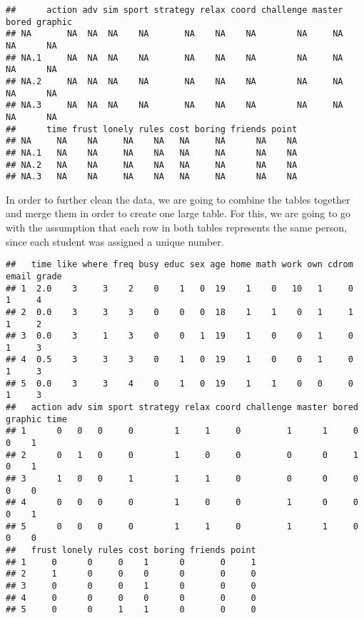 \documentclass[
]{article}
\begin{document}
\begin{verbatim}
##      action adv sim sport strategy relax coord challenge master bored graphic
## NA       NA  NA  NA    NA       NA    NA    NA        NA     NA    NA      NA
## NA.1     NA  NA  NA    NA       NA    NA    NA        NA     NA    NA      NA
## NA.2     NA  NA  NA    NA       NA    NA    NA        NA     NA    NA      NA
## NA.3     NA  NA  NA    NA       NA    NA    NA        NA     NA    NA      NA
##      time frust lonely rules cost boring friends point
## NA     NA    NA     NA    NA   NA     NA      NA    NA
## NA.1   NA    NA     NA    NA   NA     NA      NA    NA
## NA.2   NA    NA     NA    NA   NA     NA      NA    NA
## NA.3   NA    NA     NA    NA   NA     NA      NA    NA
\end{verbatim}

In order to further clean the data, we are going to combine the tables
together and merge them in order to create one large table. For this, we
are going to go with the assumption that each row in both tables
represents the same person, since each student was assigned a unique
number.

\begin{verbatim}
##   time like where freq busy educ sex age home math work own cdrom email grade
## 1  2.0    3     3    2    0    1   0  19    1    0   10   1     0     1     4
## 2  0.0    3     3    3    0    0   0  18    1    1    0   1     1     1     2
## 3  0.0    3     1    3    0    0   1  19    1    0    0   1     0     1     3
## 4  0.5    3     3    3    0    1   0  19    1    0    0   1     0     1     3
## 5  0.0    3     3    4    0    1   0  19    1    1    0   0     0     1     3
##   action adv sim sport strategy relax coord challenge master bored graphic time
## 1      0   0   0     0        1     1     0         1      1     0       0    1
## 2      0   1   0     0        1     0     0         0      0     1       0    1
## 3      1   0   0     1        1     1     0         0      0     0       0    0
## 4      0   0   0     0        1     0     0         1      0     0       0    1
## 5      0   0   0     0        1     1     0         1      1     0       0    0
##   frust lonely rules cost boring friends point
## 1     0      0     0    1      0       0     1
## 2     1      0     0    0      0       0     0
## 3     0      0     0    1      0       0     0
## 4     0      0     0    0      0       0     0
## 5     0      0     1    1      0       0     0
\end{verbatim}
\end{document}
